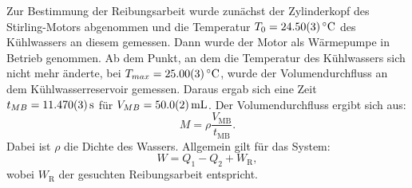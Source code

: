 	Zur Bestimmung der Reibungsarbeit wurde zunächst der Zylinderkopf des Stirling-Motors abgenommen und die Temperatur $T_0 = \SI{24,5+-0,03}{\celsius}$ des Kühlwassers an diesem gemessen.
	Dann  wurde der Motor als Wärmepumpe in Betrieb genommen.
	Ab dem Punkt, an dem die Temperatur des Kühlwassers sich nicht mehr änderte, bei $T_{max} = \SI{25,0+-0,03}{\celsius}$, wurde der Volumendurchfluss an dem Kühlwasserreservoir gemessen.
	Daraus ergab sich eine Zeit $t_{MB} = \SI{11,47+-0,003}{\second}$ für $V_{MB} = \SI{50+-0,2}{\milli\liter}$.
	Der Volumendurchfluss ergibt sich aus:
	\begin{equation} %
		M = \rho \frac{V_\text{MB}}{t_\text{MB}}.
	\end{equation} %
	Dabei ist $\rho$ die Dichte des Wassers.
	Allgemein gilt für das System:
	\begin{equation} %
		W = Q_1 - Q_2 + W_\text{R},
	\end{equation} %
	wobei $W_\text{R}$ der gesuchten Reibungsarbeit entspricht.
	
